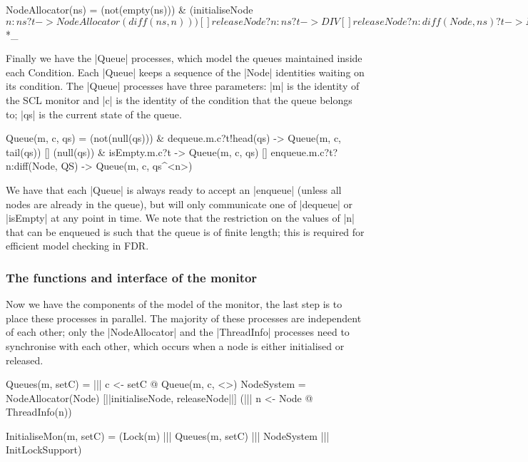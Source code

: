 \begin{cspm}[caption={The {\scalastyle NodeAllocator} process}]
  NodeAllocator(ns) = 
    (not(empty(ns))) & 
      (initialiseNode$n:ns?t -> NodeAllocator(diff(ns, {n})))
  [] releaseNode?n:ns?t -> DIV
  [] releaseNode?n:diff(Node, ns)?t -> NodeAllocator(union(ns, {n}))_*$*_
\end{cspm}

Finally we have the |Queue| processes, which model the queues maintained inside each Condition. Each |Queue| keeps a sequence of the |Node| identities waiting on its condition. The |Queue| processes have three parameters: |m| is the identity of the SCL monitor and |c| is the identity of the condition that the queue belongs to; |qs| is the current state of the queue.%

\begin{cspm}
  Queue(m, c, qs) = 
       (not(null(qs))) & dequeue.m.c?t!head(qs) -> Queue(m, c, tail(qs))
    [] (null(qs)) & isEmpty.m.c?t -> Queue(m, c, qs)
    [] enqueue.m.c?t?n:diff(Node, QS) -> Queue(m, c, qs^<n>) 
\end{cspm}

We have that each |Queue| is always ready to accept an |enqueue| (unless all nodes are already in the queue), but will only communicate one of |dequeue| or |isEmpty| at any point in time. We note that the restriction on the values of |n| that can be enqueued is such that the queue is of finite length; this is required for efficient model checking in FDR.

\subsubsection{The functions and interface of the monitor}

Now we have the components of the model of the monitor, the last step is to place these processes in parallel. The majority of these processes are independent of each other; only the |NodeAllocator| and the |ThreadInfo| processes need to synchronise with each other, which occurs when a node is either initialised or released.
\begin{cspm}
Queues(m, setC) = ||| c <- setC @ Queue(m, c, <>)
NodeSystem = 
  NodeAllocator(Node) 
    [|{|initialiseNode, releaseNode|}|] (||| n <- Node @ ThreadInfo(n))
    
InitialiseMon(m, setC) = 
  (Lock(m) ||| Queues(m, setC) ||| NodeSystem ||| InitLockSupport)
\end{cspm} 

